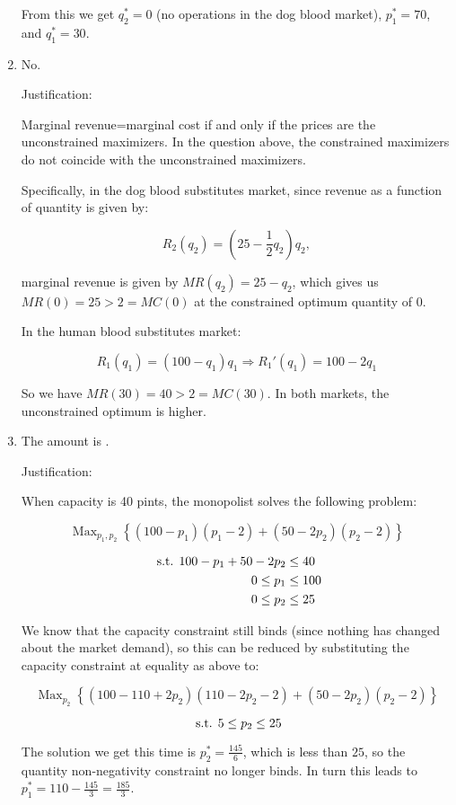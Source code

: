 \documentclass{article}
\DeclareMathOperator*{\Max}{Max}
\newcommand{\st}{\hbox{ s.t. }}
\newenvironment{solution}{\color{red}}{\color{black}}
\begin{document}
\begin{solution}
\begin{enumerate}
From this we get $q_2^{*} = 0$ (no operations in the dog blood market), $p_1^{*} = 70$, and $q_1^{*} = 30$.

\item No.

Justification:

Marginal revenue=marginal cost if and only if the prices are the unconstrained maximizers. In the question above, the constrained maximizers do not coincide with the unconstrained maximizers.

Specifically, in the dog blood substitutes market, since revenue as a function of quantity is given by:

\[ R_2(q_2) = (25 - \frac12 q_2)q_2, \]

marginal revenue is given by $MR(q_2) = 25 - q_2$, which gives us $MR(0) = 25 > 2 = MC(0)$ at the constrained optimum quantity of 0.

In the human blood substitutes market:

\[ R_1(q_1) = (100 - q_1)q_1 \Rightarrow R_1'(q_1) = 100 - 2q_1 \]

So we have $MR(30) = 40 > 2 = MC(30)$. In both markets, the unconstrained optimum is higher.

\item The amount is .

Justification:

When capacity is 40 pints, the monopolist solves the following problem:

\[ \Max_{p_1,p_2} \left\{ (100-p_1)(p_1-2)+(50-2p_2)(p_2-2) \right\} \]

\begin{align*}
\st 100-p_1+50-2p_2 &\leq 40 \\
 0\leq p_1 &\leq 100 \\
 0\leq p_2 &\leq 25 \\
\end{align*}

We know that the capacity constraint still binds (since nothing has changed about the market demand), so this can be reduced by substituting the capacity constraint at equality as above to:

\[ \Max_{p_2} \left\{ (100-110+2p_2)(110-2p_2-2)+(50-2p_2)(p_2-2) \right\} \]

\[ \st 5\leq p_2 \leq 25 \]

The solution we get this time is $p_2^{*} = \frac{145}6$, which is less than $25$, so the quantity non-negativity constraint no longer binds. In turn this leads to $p_1^{*} = 110 - \frac{145}3 = \frac{185}3$.


\end{enumerate}
\end{solution}
\end{document}
